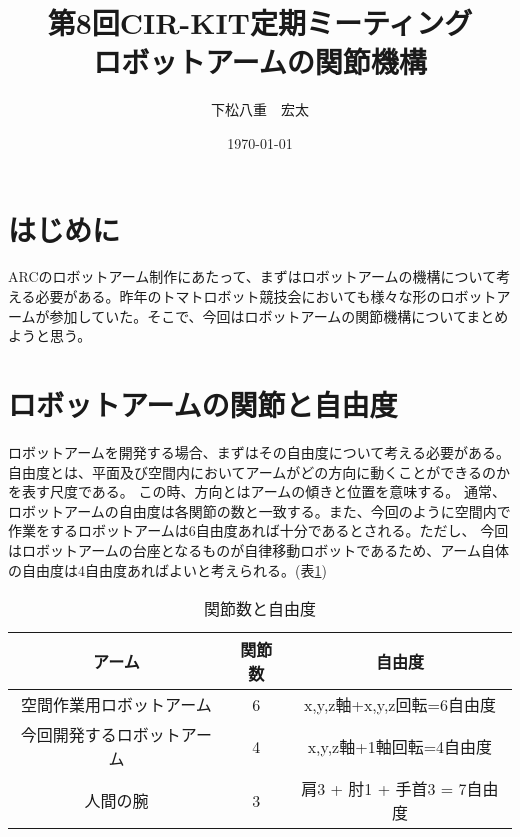 \documentclass[12pt,a4j]{jarticle}
\title {第8回CIR-KIT定期ミーティング\\ロボットアームの関節機構}
\author {下松八重　宏太}
\date {\today}
\begin{document}
\maketitle

\section{はじめに}
ARCのロボットアーム制作にあたって、まずはロボットアームの機構について考える必要がある。昨年のトマトロボット競技会においても様々な形のロボットアームが参加していた。そこで、今回はロボットアームの関節機構についてまとめようと思う。

\section{ロボットアームの関節と自由度}
ロボットアームを開発する場合、まずはその自由度について考える必要がある。
自由度とは、平面及び空間内においてアームがどの方向に動くことができるのかを表す尺度である。
この時、方向とはアームの傾きと位置を意味する。
通常、ロボットアームの自由度は各関節の数と一致する。また、今回のように空間内で作業をするロボットアームは6自由度あれば十分であるとされる。ただし、
今回はロボットアームの台座となるものが自律移動ロボットであるため、アーム自体の自由度は4自由度あればよいと考えられる。(表\ref{tab:arm})
 
\begin{table}[htb]
\begin{center}
  \caption{関節数と自由度}
  \begin{tabular}{|c|c|c|} \hline
  アーム&関節数 &自由度 \\ \hline \hline
  空間作業用ロボットアーム&6&x,y,z軸+x,y,z回転=6自由度\\ \hline
  今回開発するロボットアーム& 4&x,y,z軸+1軸回転=4自由度\\ \hline
  人間の腕&3& 肩3 + 肘1 + 手首3 = 7自由度\\ \hline
  \end{tabular}
\label{tab:arm}
\end{center}
\end{table}


\newpage
\end{document}
